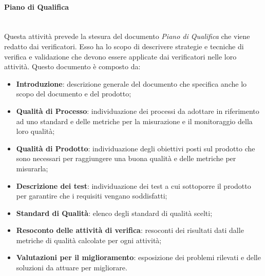 \paragraph{Piano di Qualifica}\mbox{}\\ [1mm]
Questa attività prevede la stesura del documento \textit{Piano di Qualifica} che viene redatto dai verificatori. Esso ha lo scopo di descrivere strategie e tecniche di verifica e validazione che devono essere applicate dai verificatori nelle loro attività.
Questo documento è composto da:
\begin{itemize}
	\item \textbf{Introduzione}: descrizione generale del documento che specifica anche lo scopo del documento e del prodotto;
	\item \textbf{Qualità di Processo}: individuazione dei processi da adottare in riferimento ad uno standard e delle metriche per la misurazione e il monitoraggio della loro qualità;
	\item \textbf{Qualità di Prodotto}: individuazione degli obiettivi posti sul prodotto che sono necessari per raggiungere una buona qualità e delle metriche per misurarla;
	\item \textbf{Descrizione dei test}: individuazione dei test a cui sottoporre il prodotto per garantire che i requisiti vengano soddisfatti;
	\item \textbf{Standard di Qualità}: elenco degli standard di qualità scelti;
	\item \textbf{Resoconto delle attività di verifica}: resoconti dei risultati dati dalle metriche di qualità calcolate per ogni attività;
	\item \textbf{Valutazioni per il miglioramento}: esposizione dei problemi rilevati e delle soluzioni da attuare per migliorare.
\end{itemize}
